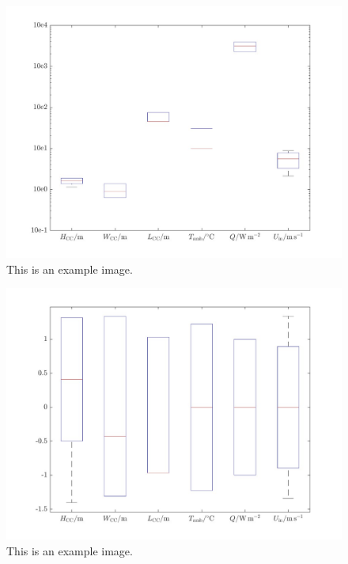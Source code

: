         \begin{figure}[H]
            \centering
            \includegraphics[width=1\textwidth]{00_Images/00_Large_Stack_Images/00_Combined_Boxplot_Features_July_10_2024_v1.jpg}  %
            \caption{This is an example image.}
            \label{fig:example1}
        \end{figure}

        \begin{figure}[H]
            \centering
            \includegraphics[width=1\textwidth]{00_Images/00_Large_Stack_Images/00_Combined_Boxplot_Normalized_Features_July_10_2024_v1.jpg}  %
            \caption{This is an example image.}
            \label{fig:example1}
        \end{figure}

